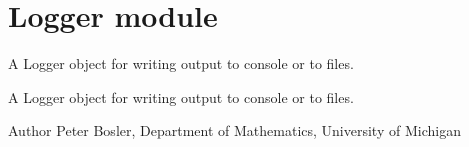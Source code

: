 \hypertarget{group___logger}{\section{Logger module}
\label{group___logger}
}


A Logger object for writing output to console or to files.  


A Logger object for writing output to console or to files. 

\begin{DoxyAuthor}{Author}
Peter Bosler, Department of Mathematics, University of Michigan 
\end{DoxyAuthor}
